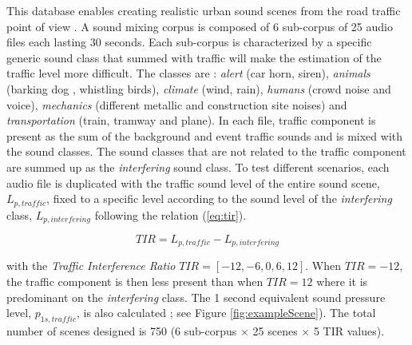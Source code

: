 \documentclass[twocolumn,a4paper,10pt]{article}
\begin{document}
This database enables creating realistic urban sound scenes from the road traffic point of view \cite{gloaguen_creation_2017}. A sound mixing corpus is composed of 6 sub-corpus of 25 audio files each lasting 30 seconds. Each sub-corpus is characterized by a specific generic sound class that summed with traffic will make the estimation of the traffic level more difficult. The classes are : \textit{alert} (car horn, siren), \textit{animals} (barking dog , whistling birds), \textit{climate} (wind, rain), \textit{humans} (crowd noise and voice), \textit{mechanics} (different metallic and construction site noises) and \textit{transportation} (train, tramway and plane). In each file, traffic component is present as the sum of the background and event traffic sounds and is mixed with the sound classes. The sound classes that are not related to the traffic component are summed up as the \textit{interfering} sound class. To test different scenarios, each audio file is duplicated with the traffic sound level of the entire sound scene, $L_{p,traffic}$, fixed to a specific level according to the sound level of the \textit{interfering} class, $L_{p,interfering}$ following the relation (\ref{eq:tir}).

\begin{equation}\label{eq:tir}
TIR = L_{p,traffic}-L_{p,interfering}
\end{equation}

with the \textit{Traffic Interference Ratio} $TIR = \left[-12, -6, 0, 6, 12\right]$. When $TIR = -12$, the traffic component is then less present than when $TIR = 12$ where it is predominant on the \textit{interfering} class. The 1 second equivalent sound pressure level, $p_{1s,traffic}$, is also calculated ; see Figure \ref{fig:exampleScene}). The total number of scenes designed is 750 (6 sub-corpus $\times$ 25 scenes $\times$  5 TIR values).
\end{document}

